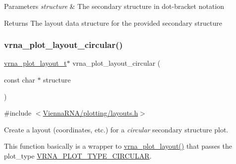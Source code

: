 \begin{DoxyParams}{Parameters}
{\em structure} & The secondary structure in dot-\/bracket notation \\
\hline
\end{DoxyParams}
\begin{DoxyReturn}{Returns}
The layout data structure for the provided secondary structure 
\end{DoxyReturn}
\mbox{\label{group__plot__layout__utils_ga41d94adbd42e1a570d840756e6dd6909}} 
\subsubsection{\texorpdfstring{vrna\_plot\_layout\_circular()}{vrna\_plot\_layout\_circular()}}
{\footnotesize\ttfamily \mbox{\hyperlink{group__plot__layout__utils_gac986fe092abc2a6a93ceb5141e4dd28b}{vrna\+\_\+plot\+\_\+layout\+\_\+t}}$\ast$ vrna\+\_\+plot\+\_\+layout\+\_\+circular (\begin{DoxyParamCaption}\item[{const char $\ast$}]{structure }\end{DoxyParamCaption})}



{\ttfamily \#include $<$\mbox{\hyperlink{layouts_8h}{Vienna\+R\+N\+A/plotting/layouts.\+h}}$>$}



Create a layout (coordinates, etc.) for a {\itshape circular} secondary structure plot. 

This function basically is a wrapper to \mbox{\hyperlink{group__plot__layout__utils_ga7953b759eada86c61b0a4aebe0dc67d1}{vrna\+\_\+plot\+\_\+layout()}} that passes the {\ttfamily plot\+\_\+type} \mbox{\hyperlink{group__plot__layout__utils_ga8c9eac631348da92136c8363ecdd9fb9}{V\+R\+N\+A\+\_\+\+P\+L\+O\+T\+\_\+\+T\+Y\+P\+E\+\_\+\+C\+I\+R\+C\+U\+L\+AR}}.

